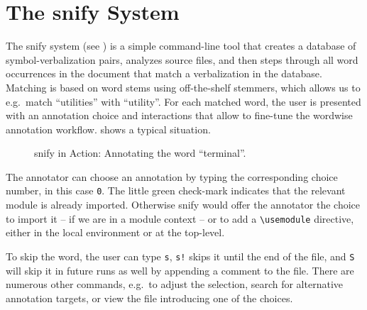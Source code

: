 \documentclass{llncs}
\newcommand\snify{\textsf{snify}\xspace}
\begin{document}
\section{The \snify System}

The \snify{}
system (see \cite{stextools:git}) is a simple command-line tool
that creates a database of symbol-verbalization pairs, analyzes \sTeX source files,
and then steps through all word occurrences in the document that match a
verbalization in the database.
Matching is based on word stems using off-the-shelf stemmers, which allows us to
e.g.\ match ``utilities'' with ``utility''.
For each matched word, the user is presented with an annotation choice and
interactions that allow to fine-tune the wordwise annotation workflow. 
shows a typical situation.

\begin{figure}[ht]
  \setlength{\fboxsep}{0pt}
  \caption{\snify in Action: Annotating the word ``terminal''.}\label{fig:snify}
\end{figure}

The annotator can choose an annotation by typing the corresponding choice number,
in this case \lstinline|0|.
The little green check-mark indicates that the relevant module is already imported.
Otherwise \snify would offer the annotator the choice to import it -- if we are
in a module context -- or to add a \lstinline|\usemodule| directive, either in the
local environment or at the top-level.

To skip the word, the user can type \lstinline|s|,
\lstinline|s!| skips it until the end of the file, and \lstinline|S|
will skip it in future runs as well by appending a comment to the file.
There are numerous other commands, e.g.\ to adjust the selection,
search for alternative annotation targets,
or view the file introducing one of the choices.
\end{document}
